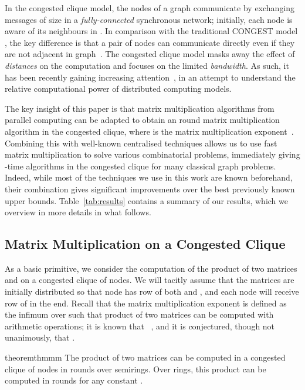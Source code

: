In the congested clique model, the  nodes of a graph  communicate by exchanging messages of  size in a \emph{fully-connected} synchronous network; initially, each node is aware of its neighbours in . In comparison with the traditional CONGEST model \cite{peleg00}, the key difference is that a pair of nodes can communicate directly even if they are not adjacent in graph~. The congested clique model masks away the effect of \emph{distances} on the computation and focuses on the limited \emph{bandwidth}. As such, it has been recently gaining increasing attention~\cite{PemmarajuS14_MST_logloglogn,tritri,drucker13,lenzen2013optimal,lotker05,nanongkai14, LenzenW11,patt-shamir11,hegeman14,HegemanP14}, in an attempt to understand the relative computational power of distributed computing models.

The key insight of this paper is that matrix multiplication algorithms from parallel computing can be adapted to obtain an  round matrix multiplication algorithm in the congested clique, where  is the matrix multiplication exponent~\cite{legall2014powers}. Combining this with well-known centralised techniques allows us to use fast matrix multiplication to solve various combinatorial problems, immediately giving -time algorithms in the congested clique for many classical graph problems. Indeed, while most of the techniques we use in this work are known beforehand, their combination gives significant improvements over the best previously known upper bounds. Table~\ref{tab:results} contains a summary of our results, which we overview in more details in what follows.

\subsection{Matrix Multiplication on a Congested Clique}

As a basic primitive, we consider the computation of the product  of two  matrices  and  on a congested clique of  nodes. We will tacitly assume that the matrices are initially distributed so that node  has row  of both  and , and each node will receive row  of  in the end. Recall that the matrix multiplication exponent  is defined as the infimum over  such that product of two  matrices can be computed with  arithmetic operations; it is known that ~\cite{legall2014powers}, and it is conjectured, though not unanimously, that .

\begin{restatable}{theorem}{thmmm}\label{thm:mm}
The product of two matrices  can be computed in a congested clique of  nodes in
 rounds over semirings. Over rings, this product can be computed in  rounds for any constant .
\end{restatable}

